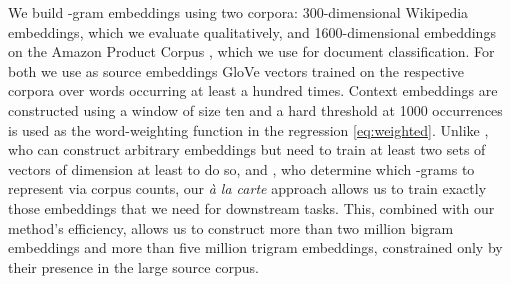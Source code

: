 \documentclass[11pt,a4paper]{article}
\begin{document}
We build -gram embeddings using two corpora: 300-dimensional Wikipedia embeddings, which we evaluate qualitatively, and 1600-dimensional embeddings on the Amazon Product Corpus \cite{McAuley:15}, which we use for document classification.
For both we use as source embeddings GloVe vectors trained on the respective corpora over words occurring at least a hundred times.
Context embeddings are constructed using a window of size ten and a hard threshold at 1000 occurrences is used as the word-weighting function in the regression \eqref{eq:weighted}.
Unlike \citet{Poliak:17}, who can construct arbitrary embeddings but need to train at least two sets of vectors of dimension at least  to do so, and \citet{Yin:14}, who determine which -grams to represent via corpus counts, our {\em\`a la carte} approach allows us to train exactly those embeddings that we need for downstream tasks.
This, combined with our method's efficiency, allows us to construct more than two million bigram embeddings and more than five million trigram embeddings, constrained only by their presence in the large source corpus.
\end{document}
